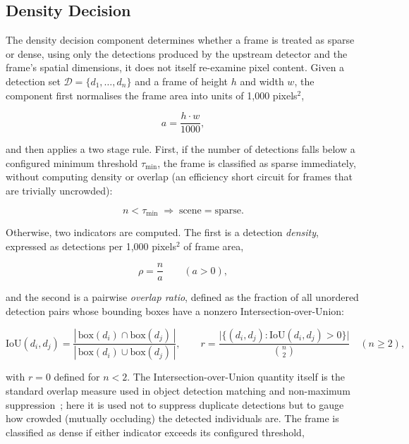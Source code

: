 \subsection{Density Decision}
\label{sec:density-decision}

The density decision component determines whether a frame is treated as sparse or dense, using only the detections produced by the upstream detector and the frame's spatial dimensions, it does not itself re-examine pixel content. Given a detection set $\mathcal{D} = \{d_1,\dots,d_n\}$ and a frame of height $h$ and width $w$, the component first normalises the frame area into units of 1{,}000 pixels$^2$,

\begin{equation}
	a = \frac{h \cdot w}{1000},
\end{equation}

and then applies a two stage rule. First, if the number of detections falls below a configured minimum threshold $\tau_{\min}$, the frame is classified as sparse immediately, without computing density or overlap (an efficiency short circuit for frames that are trivially uncrowded):

\begin{equation}
	n < \tau_{\min} \;\Rightarrow\; \text{scene} = \text{sparse}.
\end{equation}

Otherwise, two indicators are computed. The first is a detection \emph{density}, expressed as detections per 1{,}000 pixels$^2$ of frame area,

\begin{equation}
	\rho = \frac{n}{a} \qquad (a>0),
\end{equation}

and the second is a pairwise \emph{overlap ratio}, defined as the fraction of all unordered detection pairs whose bounding boxes have a nonzero Intersection-over-Union:

\begin{equation}
	\text{IoU}(d_i,d_j) = \frac{|\,\text{box}(d_i) \cap \text{box}(d_j)\,|}{|\,\text{box}(d_i) \cup \text{box}(d_j)\,|}, \qquad
	r = \frac{\bigl|\{(d_i,d_j) : \text{IoU}(d_i,d_j) > 0\}\bigr|}{\binom{n}{2}} \quad (n \ge 2),
\end{equation}

with $r = 0$ defined for $n<2$. The Intersection-over-Union quantity itself is the standard overlap measure used in object detection matching and non-maximum suppression~\cite{everingham2010voc}; here it is used not to suppress duplicate detections but to gauge how crowded (mutually occluding) the detected individuals are. The frame is classified as dense if either indicator exceeds its configured threshold,


